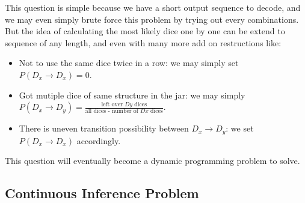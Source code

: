 \documentclass[11pt]{article}
\begin{document}
This question is simple because we have a short output sequence to decode, and we may even simply brute force this problem by trying out every combinations. But the idea of calculating the most likely dice one by one can be extend to sequence of any length, and even with many more add on restructions like:

\begin{itemize}
    \item Not to use the same dice twice in a row: we may simply set $P(D_x \to D_x) = 0$.
    \item Got mutiple dice of same structure in the jar: we may simply $P(D_x \to D_y) = \frac{\text{left over $Dy$ dices}}{\text{all dices - number of $Dx$ dices}}$.
    \item There is uneven transition possibility between $D_x \to D_y$: we set $P(D_x \to D_x)$ accordingly.
\end{itemize}

This question will eventually become a dynamic programming problem to solve.

\subsection*{Continuous Inference Problem}
\end{document}
